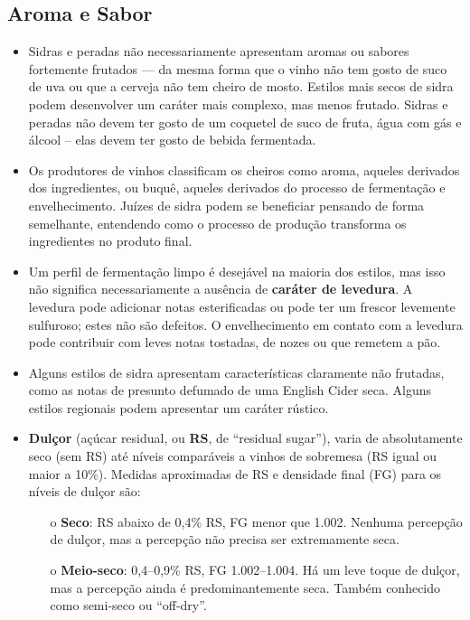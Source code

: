 \subsection*{Aroma e Sabor}

\begin{itemize}
\item Sidras e peradas não necessariamente apresentam aromas ou sabores fortemente frutados — da mesma forma que o vinho não tem gosto de suco de uva ou que a cerveja não tem cheiro de mosto. Estilos mais secos de sidra podem desenvolver um caráter mais complexo, mas menos frutado. Sidras e peradas não devem ter gosto de um coquetel de suco de fruta, água com gás e álcool – elas devem ter gosto de bebida fermentada.
\item Os produtores de vinhos classificam os cheiros como aroma, aqueles derivados dos ingredientes, ou buquê, aqueles derivados do processo de fermentação e envelhecimento. Juízes de sidra podem se beneficiar pensando de forma semelhante, entendendo como o processo de produção transforma os ingredientes no produto final.
\item Um perfil de fermentação limpo é desejável na maioria dos estilos, mas isso não significa necessariamente a ausência de \textbf{caráter de levedura}. A levedura pode adicionar notas esterificadas ou pode ter um frescor levemente sulfuroso; estes não são defeitos. O envelhecimento em contato com a levedura pode contribuir com leves notas tostadas, de nozes ou que remetem a pão.
\item Alguns estilos de sidra apresentam características claramente não frutadas, como as notas de presunto defumado de uma English Cider seca. Alguns estilos regionais podem apresentar um caráter rústico.
\item \textbf{Dulçor} (açúcar residual, ou \textbf{RS}, de “residual sugar”), varia de absolutamente seco (sem RS) até níveis comparáveis a vinhos de sobremesa (RS igual ou maior a 10\%). Medidas aproximadas de RS e densidade final (FG) para os níveis de dulçor são:
  \begin{itemize}
  \item[o] \textbf{Seco}: RS abaixo de 0,4\% RS, FG menor que 1.002. Nenhuma percepção de dulçor, mas a percepção não precisa ser extremamente seca.
  \item[o] \textbf{Meio-seco}: 0,4–0,9\% RS, FG 1.002–1.004. Há um leve toque de dulçor, mas a percepção ainda é predominantemente seca. Também conhecido como semi-seco ou “off-dry”.

\end{itemize}
\end{itemize}
